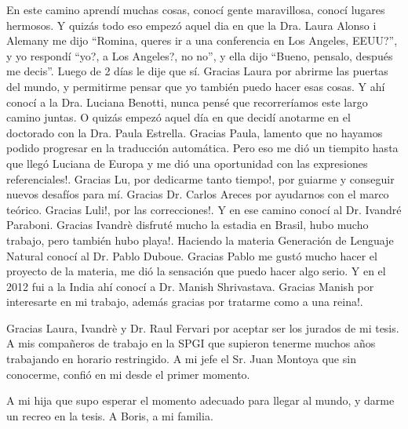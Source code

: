 
\vspace*{\fill}


En este camino aprend\'i muchas cosas, conoc\'i gente maravillosa, conoc\'i lugares hermosos. Y quiz\'as todo eso empez\'o aquel dia en que la Dra. Laura Alonso i Alemany me dijo ``Romina, queres ir a una conferencia en Los Angeles, EEUU?'', y yo respond\'i ``yo?, a Los Angeles?, no no'', y ella dijo ``Bueno, pensalo, despu\'es me decis''. Luego de 2 d\'ias le dije que s\'i. Gracias Laura por abrirme las puertas del mundo, y permitirme pensar que yo tambi\'en puedo hacer esas cosas. Y ah\'i conoc\'i a la Dra. Luciana Benotti, nunca pens\'e que recorrer\'iamos este largo camino juntas. O quiz\'as empez\'o aquel d\'ia en que decid\'i anotarme en el doctorado con la Dra. Paula Estrella. Gracias Paula, lamento que no hayamos podido progresar en la traducci\'on autom\'atica. Pero eso me di\'o un tiempito hasta que lleg\'o Luciana de Europa y me di\'o una oportunidad con las expresiones referenciales!. Gracias Lu, por dedicarme tanto tiempo!, por guiarme y conseguir nuevos desaf\'ios para m\'i. Gracias Dr. Carlos Areces por ayudarnos con el marco te\'orico. Gracias Luli!, por las correcciones!. 
Y en ese camino conoc\'i al Dr. Ivandr\'e Paraboni. Gracias Ivandr\`e disfrut\'e mucho la estadia en Brasil, hubo mucho trabajo, pero tambi\'en hubo playa!. Haciendo la materia Generaci\'on de Lenguaje Natural conoc\'i al Dr. Pablo Duboue. Gracias Pablo me gust\'o mucho hacer el proyecto de la materia, me di\'o la sensaci\'on que puedo hacer algo serio. Y en el 2012 fui a la India ah\'i conoc\'i a Dr. Manish Shrivastava. Gracias Manish por interesarte en mi trabajo, adem\'as gracias por tratarme como a una reina!. 

Gracias Laura, Ivandr\`e y Dr. Raul Fervari por aceptar ser los jurados de mi tesis.
A mis compa\~neros de trabajo en la SPGI que supieron tenerme muchos a\~nos trabajando en horario restringido. A mi jefe el Sr. Juan Montoya que sin conocerme, confi\'o en mi desde el primer momento.

A mi hija que supo esperar el momento adecuado para llegar al mundo, y darme un recreo en la tesis. A Boris, a mi familia. 


\vspace{\fill}
